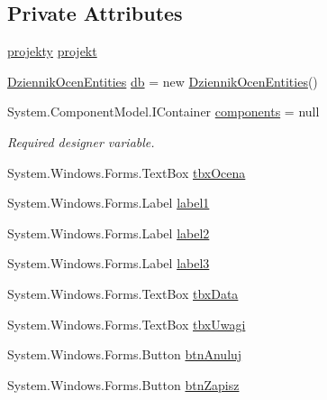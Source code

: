 \subsection*{Private Attributes}
\begin{DoxyCompactItemize}
\item 
\hyperlink{class_dziennik_ocen_1_1projekty}{projekty} \hyperlink{class_dziennik_ocen_1_1_form_zarzadzaj_projektem_ad28eeefcf293cabe18ed034de6f7b9b9}{projekt}
\item 
\hyperlink{class_dziennik_ocen_1_1_dziennik_ocen_entities}{Dziennik\+Ocen\+Entities} \hyperlink{class_dziennik_ocen_1_1_form_zarzadzaj_projektem_a2db3713590e45e56a37c3b7220b6453c}{db} = new \hyperlink{class_dziennik_ocen_1_1_dziennik_ocen_entities}{Dziennik\+Ocen\+Entities}()
\item 
System.\+Component\+Model.\+I\+Container \hyperlink{class_dziennik_ocen_1_1_form_zarzadzaj_projektem_a6e97af0a821e84d1bc6aea234de2d443}{components} = null
\begin{DoxyCompactList}\small\item\em Required designer variable. \end{DoxyCompactList}\item 
System.\+Windows.\+Forms.\+Text\+Box \hyperlink{class_dziennik_ocen_1_1_form_zarzadzaj_projektem_a3c52e78830d152bcd9687d57d2f73dd0}{tbx\+Ocena}
\item 
System.\+Windows.\+Forms.\+Label \hyperlink{class_dziennik_ocen_1_1_form_zarzadzaj_projektem_ae6542c6fd11a611106ab7f0cd3640ebf}{label1}
\item 
System.\+Windows.\+Forms.\+Label \hyperlink{class_dziennik_ocen_1_1_form_zarzadzaj_projektem_a3eedf20c866486ca2910dd519d28bb31}{label2}
\item 
System.\+Windows.\+Forms.\+Label \hyperlink{class_dziennik_ocen_1_1_form_zarzadzaj_projektem_a1662ef206e960bcb8bb903c0b8335094}{label3}
\item 
System.\+Windows.\+Forms.\+Text\+Box \hyperlink{class_dziennik_ocen_1_1_form_zarzadzaj_projektem_aa8803c03bc8917991c70877a55c3f30a}{tbx\+Data}
\item 
System.\+Windows.\+Forms.\+Text\+Box \hyperlink{class_dziennik_ocen_1_1_form_zarzadzaj_projektem_ac1bfcac93cf76188c272dee28a136238}{tbx\+Uwagi}
\item 
System.\+Windows.\+Forms.\+Button \hyperlink{class_dziennik_ocen_1_1_form_zarzadzaj_projektem_abf06a8fd2ddc8622e1f3310250bf8fdc}{btn\+Anuluj}
\item 
System.\+Windows.\+Forms.\+Button \hyperlink{class_dziennik_ocen_1_1_form_zarzadzaj_projektem_acce0d9c3197e6545fef245a6729baa41}{btn\+Zapisz}
\end{DoxyCompactItemize}



